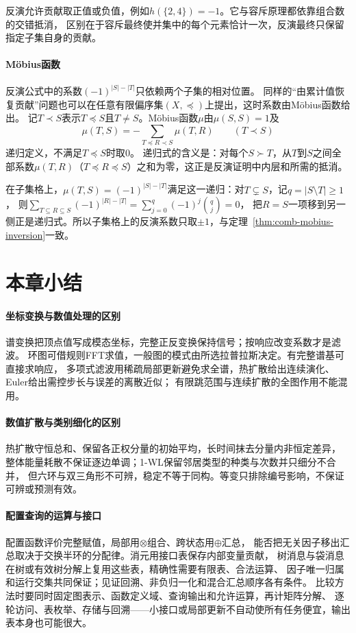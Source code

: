 反演允许贡献取正值或负值，例如$h(\{2,4\})=-1$。它与容斥原理都依靠组合数的交错抵消，
区别在于容斥最终使并集中的每个元素恰计一次，反演最终只保留指定子集自身的贡献。

\paragraph{Möbius函数}

反演公式中的系数$(-1)^{|S|-|T|}$只依赖两个子集的相对位置。
同样的“由累计值恢复贡献”问题也可以在任意有限偏序集$(X,\preceq)$上提出，这时系数由Möbius函数给出。
记$T\prec S$表示$T\preceq S$且$T\neq S$。Möbius函数$\mu$由$\mu(S,S)=1$及
\[
 \mu(T,S)=-\sum_{T\preceq R\prec S}\mu(T,R)\qquad(T\prec S)
\]
递归定义，不满足$T\preceq S$时取$0$。
递归式的含义是：对每个$S\succ T$，从$T$到$S$之间全部系数$\mu(T,R)$（$T\preceq R\preceq S$）之和为零，这正是反演证明中内层和所需的抵消。

在子集格上，$\mu(T,S)=(-1)^{|S|-|T|}$满足这一递归：对$T\subsetneq S$，记$q=|S\setminus T|\geq1$，
则$\sum_{T\subseteq R\subseteq S}(-1)^{|R|-|T|}=\sum_{j=0}^q(-1)^j\binom qj=0$，
把$R=S$一项移到另一侧正是递归式。所以子集格上的反演系数只取$\pm1$，与定理~\ref{thm:comb-mobius-inversion}一致。

\FloatBarrier
\section{本章小结}

\paragraph{坐标变换与数值处理的区别}
谱变换把顶点值写成模态坐标，完整正反变换保持信号；按响应改变系数才是滤波。
环图可借规则FFT求值，一般图的模式由所选拉普拉斯决定。有完整谱基可直接求响应，
多项式滤波用稀疏局部更新避免求全谱，热扩散给出连续演化、Euler给出需控步长与误差的离散近似；
有限跳范围与连续扩散的全图作用不能混用。

\paragraph{数值扩散与类别细化的区别}
热扩散守恒总和、保留各正权分量的初始平均，长时间抹去分量内非恒定差异，
整体能量耗散不保证逐边单调；1-WL保留邻居类型的种类与次数并只细分不合并，
但六环与双三角形不可辨，稳定不等于同构。等变只排除编号影响，不保证可辨或预测有效。

\paragraph{配置查询的运算与接口}
配置函数评价完整赋值，局部用$\otimes$组合、跨状态用$\oplus$汇总，
能否把无关因子移出汇总取决于交换半环的分配律。消元用接口表保存内部变量贡献，
树消息与袋消息在树或有效树分解上复用这些表，精确性需要有限表、合法运算、
因子唯一归属和运行交集共同保证；见证回溯、非负归一化和混合汇总顺序各有条件。
比较方法时要同时固定图表示、函数定义域、查询输出和允许运算，再计矩阵分解、
逐轮访问、表枚举、存储与回溯——小接口或局部更新不自动使所有任务便宜，输出表本身也可能很大。

